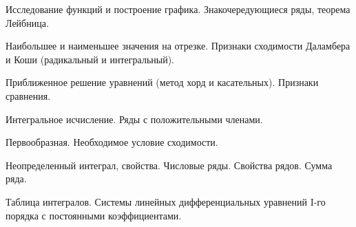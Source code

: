 \documentclass[
	14pt,
	a4paper,
	]
	{scrartcl}
\begin{document}
\vfill

\newpage


\shapk
{}
\setcounter{zad}{0}

\vfill
\z Исследование функций и построение графика.
 \vfill
\z Знакочередующиеся ряды, теорема Лейбница.
 \vfill

\vfill

\newpage


\shapk
{}
\setcounter{zad}{0}

\vfill
\z Наибольшее и наименьшее значения на отрезке.
 \vfill
\z Признаки сходимости Даламбера и Коши (радикальный и интегральный).
 \vfill

\vfill

\newpage


\shapk
{}
\setcounter{zad}{0}

\vfill
\z Приближенное решение уравнений (метод хорд и касательных).
 \vfill
\z Признаки сравнения.
 \vfill

\vfill

\newpage


\shapk
{}
\setcounter{zad}{0}

\vfill
\z Интегральное исчисление.
 \vfill
\z Ряды с положительными членами.
 \vfill

\vfill

\newpage


\shapk
{}
\setcounter{zad}{0}

\vfill
\z Первообразная.
 \vfill
\z Необходимое условие сходимости.
 \vfill

\vfill

\newpage


\shapk
{}
\setcounter{zad}{0}

\vfill
\z Неопределенный интеграл, свойства.
 \vfill
\z Числовые ряды. Свойства рядов. Сумма ряда.
 \vfill

\vfill

\newpage


\shapk
{}
\setcounter{zad}{0}

\vfill
\z Таблица интегралов.
 \vfill
\z Системы линейных дифференциальных уравнений I-го порядка с постоянными коэффициентами.
 \vfill

\vfill

\newpage


\shapk
{}
\setcounter{zad}{0}
\end{document}
